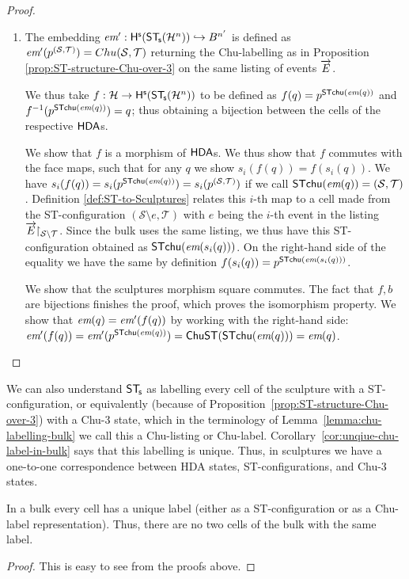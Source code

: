 \begin{proof}
\begin{enumerate}
            \item The embedding $\textit{em}':\mathsf{H}^{\mathsf{s}}(\mathsf{ST}_{\!\mathsf{s}}(\mathcal{H}^{n})) \hookrightarrow B^{n'}$ is defined as $\textit{em}'(p^{(\mathcal{S},\mathcal{T})}) = Chu(\mathcal{S},\mathcal{T})$ returning the Chu-labelling as in Proposition \ref{prop:ST-structure-Chu-over-3} on the same listing of events $\overrightarrow{E}$.
            
            We thus take $f: \mathcal{H} \rightarrow \mathsf{H}^{\mathsf{s}}(\mathsf{ST}_{\!\mathsf{s}}(\mathcal{H}^{n}))$ to be defined as $f(q)=p^{\mathsf{ST}\mathsf{chu}(\textit{em}(q))}$ and $f^{-1}(p^{\mathsf{ST}\mathsf{chu}(\textit{em}(q))})=q$; thus obtaining a bijection between the cells of the respective $\text{\textup{\textsf{HDA}}}$s.
            
            We show that $f$ is a morphism of $\text{\textup{\textsf{HDA}}}$s. We thus show that $f$ commutes with the face maps, such that for any $q$ we show $s_{i}(f(q))=f(s_{i}(q))$. We have $s_{i}(f(q)) = s_{i}(p^{\mathsf{ST}\mathsf{chu}(\textit{em}(q))})=s_{i}(p^{(\mathcal{S},\mathcal{T})})$ if we call $\mathsf{ST}\mathsf{chu}(\textit{em}(q))=(\mathcal{S},\mathcal{T})$. Definition \ref{def:ST-to-Sculptures} relates this $i$-th map to a cell made from the ST-configuration $(\mathcal{S} \setminus e,\mathcal{T})$ with $e$ being the $i$-th event in the listing $\overrightarrow{E}\!\!\upharpoonright_{\mathcal{S}\setminus \mathcal{T}}$. Since the bulk uses the same listing, we thus have this ST-configuration obtained as $\mathsf{ST}\mathsf{chu}(\textit{em}(s_{i}(q)))$. On the right-hand side of the equality we have the same by definition $f(s_{i}(q))=p^{\mathsf{ST}\mathsf{chu}(\textit{em}(s_{i}(q)))}$.

            We show that the sculptures morphism square commutes. The fact that $f,b$ are bijections finishes the proof, which proves the isomorphism property. We show that $\textit{em}(q)=\textit{em}'(f(q))$ by working with the right-hand side: $\textit{em}'(f(q))=\textit{em}'(p^{\mathsf{ST}\mathsf{chu}(\textit{em}(q))})=\mathsf{ChuST}(\mathsf{ST}\mathsf{chu}(\textit{em}(q)))=\textit{em}(q)$.
        \end{enumerate}    
    \end{proof}
    
    We can also understand $\mathsf{ST}_{\!\mathsf{s}}$ as labelling every cell of the sculpture with a ST-configuration, or equivalently (because of Proposition~\ref{prop:ST-structure-Chu-over-3}) with a Chu-3 state, which in the terminology of Lemma~\ref{lemma:chu-labelling-bulk} we call this a Chu-listing or Chu-label. Corollary~\ref{cor:unqiue-chu-label-in-bulk} says that this labelling is unique. Thus, in sculptures we have a one-to-one correspondence between HDA states, ST-configurations, and Chu-3 states.

    \begin{corollary}\label{cor:unqiue-chu-label-in-bulk}
        In a bulk every cell has a unique label (either as a ST-configuration or as a Chu-label representation). Thus, there are no two cells of the bulk with the same label.
    \end{corollary}

    \begin{proof}
        This is easy to see from the proofs above.
    \end{proof}